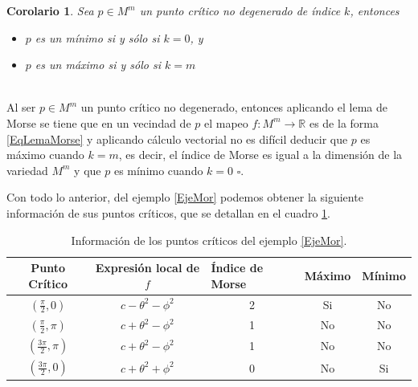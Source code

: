 \documentclass[a4paper,10pt]{book}
\newtheorem{coro}{Corolario}[chapter]
\begin{document}
\begin{coro}\label{cor1}
Sea $p\in M^{m}$ un punto cr\'itico no degenerado de \'indice $k$, entonces 
\begin{itemize}
	\item $p$ es un m\'inimo si y s\'olo si $k=0$, y 
	\item $p$ es un m\'aximo si y s\'olo si $k=m$
\end{itemize}
\end{coro}
\\
Al ser $p\in M^{m}$ un punto cr\'itico no degenerado, entonces aplicando el lema de Morse se tiene que en un vecindad de $p$ el mapeo $f:M^{m}\to\mathbb{R}$ es de la forma \ref{EqLemaMorse} y aplicando c\'alculo vectorial no es dif\'icil deducir que $p$ es m\'aximo cuando $k=m$, es decir, el \'indice de Morse es igual a la dimensi\'on de la variedad $M^{m}$ y que $p$ es m\'inimo cuando $k=0$ \hfill $\square$.
\vspace{5mm}

Con todo lo anterior, del ejemplo \ref{EjeMor} podemos obtener la siguiente informaci\'on de sus puntos cr\'iticos, que se detallan en el cuadro \ref{tabla0}.
\begin{table}[!ht]
\centering
\begin{tabular}{|c|c|c|c|c|}
\hline
\multicolumn{1}{|c|}{Punto Cr\'itico}     & Expresi\'on local de $f$ & \multicolumn{1}{l|}{\'Indice de Morse} & \multicolumn{1}{l|}{M\'aximo} & \multicolumn{1}{l|}{M\'inimo} \\ \hline
\multicolumn{1}{|c|}{$(\frac{\pi}{2},0)$} & $c-\theta^{2}-\phi^{2}$  & 2                                      & Si                            & No                            \\ \hline
$(\frac{\pi}{2},\pi)$                     & $c+\theta^{2}-\phi^{2}$  & 1                                      & No                            & No                            \\ \hline
$(\frac{3\pi}{2},\pi)$                    & $c+\theta^{2}-\phi^{2}$  & 1                                      & No                            & No                            \\ \hline
$(\frac{3\pi}{2},0)$                      & $c+\theta^{2}+\phi^{2}$  & 0                                      & No                            & Si                            \\ \hline
\end{tabular}
\caption{Informaci\'on de los puntos cr\'iticos del ejemplo \ref{EjeMor}.}
\label{tabla0}
\end{table}
\end{document}
